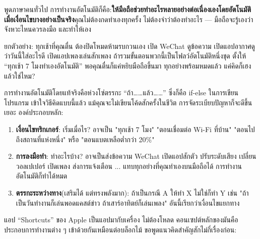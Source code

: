 


พูดภาษาคนทั่วไป การทำงานอัตโนมัติก็คือ:\textbf{ให้มือถือช่วยทำอะไรหลายอย่างต่อเนื่องเองโดยอัตโนมัติ เมื่อเงื่อนไขบางอย่างเป็นจริง}คุณไม่ต้องกดทำเองทุกครั้ง ไม่ต้องจำว่าต้องทำอะไร — มือถือจะรู้เองว่าจังหวะไหนควรลงมือ และทำให้เอง

ยกตัวอย่าง: ทุกเช้าที่คุณตื่น ต้องปิดโหมดห้ามรบกวนเอง เปิด WeChat ดูข้อความ เปิดแอปอากาศดูว่าวันนี้ใส่อะไรดี เปิดแอปเพลงเล่นสักเพลง ถ้ารวมขั้นตอนพวกนี้เป็นโฟลว์อัตโนมัติหนึ่งชุด ตั้งให้ “ทุกเช้า 7 โมงทำเองอัตโนมัติ” พอคุณตื่นก็แค่หยิบมือถือขึ้นมา ทุกอย่างพร้อมหมดแล้ว แค่คิดก็เฮงแล้วใช่ไหม?

การทำงานอัตโนมัติโดยแท้จริงคือห่วงโซ่ตรรกะ “ถ้า……แล้ว……” ซึ่งก็คือ if-else ในการเขียนโปรแกรม เข้าใจวิธีคิดแบบนี้แล้ว แม้คุณจะไม่เขียนโค้ดสักครั้งในชีวิต การจัดระเบียบปัญหาก็จะดีขึ้นเยอะ องค์ประกอบหลัก:

\begin{enumerate}
  \item \textbf{เงื่อนไขทริกเกอร์}: เริ่มเมื่อไร? อาจเป็น "ทุกเช้า 7 โมง" "ตอนเชื่อมต่อ Wi-Fi ที่บ้าน" "ตอนไปถึงสถานที่แห่งหนึ่ง" หรือ "ตอนแบตเหลือต่ำกว่า 20\%"
  \item \textbf{การลงมือทำ}: ทำอะไรบ้าง? อาจเป็นส่งข้อความ WeChat เปิดแอปสักตัว ปรับระดับเสียง เปลี่ยนวอลเปเปอร์ เปิดเพลง ส่งการแจ้งเตือน ... แทบทุกอย่างที่คุณทำเองบนมือถือได้ การทำงานอัตโนมัติก็ทำได้หมด
  \item \textbf{ตรรกะระหว่างทาง}(เสริมได้ แต่ทรงพลังมาก): ถ้าเป็นกรณี A ให้ทำ X ไม่ใช่ก็ทำ Y เช่น "ถ้าเป็นวันทำงานก็เล่นพอดแคสต์ข่าว ถ้าเสาร์อาทิตย์ก็เล่นเพลง" อันนี้เรียกว่าเงื่อนไขแยกทาง
\end{enumerate}


แอป “Shortcuts” ของ Apple เป็นแอปมากับเครื่อง ไม่ต้องโหลด คอนเซปต์หลักของมันคือประกอบการทำงานต่าง ๆ เข้าด้วยกันเหมือนต่อบล็อกไม้ ขอพูดแนวคิดสำคัญสักไม่กี่เรื่องก่อน:

